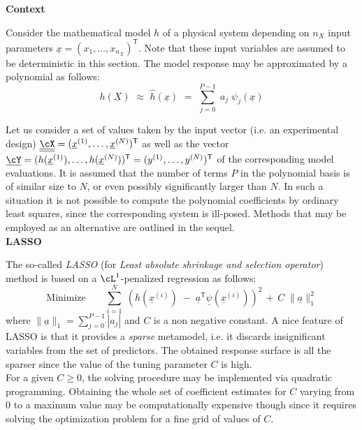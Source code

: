 {  \textbf{Context} \vspace{2mm}

  Consider the mathematical model $h$ of a physical system depending on $n_X$ input parameters $\underline{x} = (x_{1},\dots,x_{n_X})^{\textsf{T}}$. Note that these input variables are assumed to be deterministic in this section. The model response may be approximated by a polynomial as follows:
  \begin{equation} \label{eq:5-2.1}
    h(\underline{X}) \, \, \approx \, \, \widehat{h}(\underline{x}) \, \, = \, \, \sum_{j=0}^{P-1} \; a_{j} \; \psi_{j}(\underline{x})
  \end{equation}

  Let us consider a set of values taken by the input vector (i.e. an experimental design) $\underline{\underline{\cX}} = (\underline{x}^{(1)},\dots,\underline{x}^{(N)})^{\textsf{T}}$ as well as the vector $\underline{\cY} = (h(\underline{x}^{(1)}),\dots,h(\underline{x}^{(N)}))^{\textsf{T}} =  (y^{(1)},\dots,y^{(N)})^{\textsf{T}}$ of the corresponding model evaluations. It is assumed that the number of terms $P$ in the polynomial basis is of similar size to $N$, or even possibly significantly larger than $N$. In such a situation it is not possible to compute the polynomial coefficients by ordinary least squares, since the corresponding system is ill-posed. Methods that may be employed as an alternative are outlined in the sequel.  \\

  \textbf{LASSO} \vspace{2mm}

  The so-called \emph{LASSO} (for \emph{Least absolute shrinkage and selection operator}) method is based on a $\cL^{1}$-penalized regression as follows:
  \begin{equation} \label{eq:5-2.5}
    \textrm{Minimize} \quad \quad \sum_{i=1}^{N} \; \left( h(\underline{x}^{(i)}) \; - \; \underline{a}^{\textsf{T}} \underline{\psi}(\underline{x}^{(i)})  \right)^{2}
    \, + \,  C \; \|\underline{a}\|_{1}^{2}
  \end{equation}
  where $\|\underline{a}\|_{1} = \sum_{j=0}^{P-1} |a_{j}|$ and $C$ is a non negative constant. A nice feature of LASSO is that it provides a \emph{sparse} metamodel, i.e. it discards insignificant variables from the set of predictors. The obtained response surface is all the sparser since the value of the tuning parameter $C$ is high. \\

  For a given $C\geq 0$, the solving procedure may be implemented via quadratic programming. Obtaining the whole set of coefficient estimates for $C$ varying from 0 to a maximum value may be computationally expensive though since it requires solving the optimization problem for a fine grid of values of $C$.  \\

}
